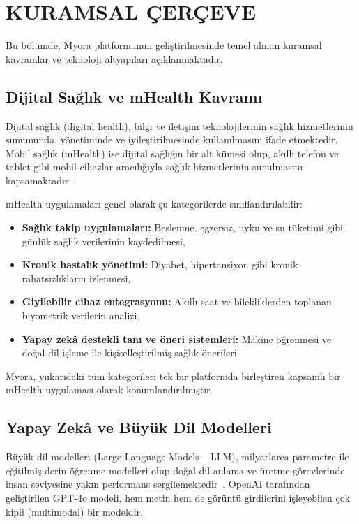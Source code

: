 \section{KURAMSAL ÇERÇEVE}
\label{sec:kuramsal}

Bu bölümde, Myora platformunun geliştirilmesinde temel alınan kuramsal kavramlar ve teknoloji altyapıları açıklanmaktadır.

\subsection{Dijital Sağlık ve mHealth Kavramı}

Dijital sağlık (digital health), bilgi ve iletişim teknolojilerinin sağlık hizmetlerinin sunumunda, yönetiminde ve iyileştirilmesinde kullanılmasını ifade etmektedir. Mobil sağlık (mHealth) ise dijital sağlığın bir alt kümesi olup, akıllı telefon ve tablet gibi mobil cihazlar aracılığıyla sağlık hizmetlerinin sunulmasını kapsamaktadır~\cite{mHealth2023}.

mHealth uygulamaları genel olarak şu kategorilerde sınıflandırılabilir:
\begin{itemize}
    \item \textbf{Sağlık takip uygulamaları:} Beslenme, egzersiz, uyku ve su tüketimi gibi günlük sağlık verilerinin kaydedilmesi,
    \item \textbf{Kronik hastalık yönetimi:} Diyabet, hipertansiyon gibi kronik rahatsızlıkların izlenmesi,
    \item \textbf{Giyilebilir cihaz entegrasyonu:} Akıllı saat ve bilekliklerden toplanan biyometrik verilerin analizi,
    \item \textbf{Yapay zekâ destekli tanı ve öneri sistemleri:} Makine öğrenmesi ve doğal dil işleme ile kişiselleştirilmiş sağlık önerileri.
\end{itemize}

Myora, yukarıdaki tüm kategorileri tek bir platformda birleştiren kapsamlı bir mHealth uygulaması olarak konumlandırılmıştır.

\subsection{Yapay Zekâ ve Büyük Dil Modelleri}

Büyük dil modelleri (Large Language Models -- LLM), milyarlarca parametre ile eğitilmiş derin öğrenme modelleri olup doğal dil anlama ve üretme görevlerinde insan seviyesine yakın performans sergilemektedir~\cite{OpenAI2023}. OpenAI tarafından geliştirilen GPT-4o modeli, hem metin hem de görüntü girdilerini işleyebilen çok kipli (multimodal) bir modeldir.

